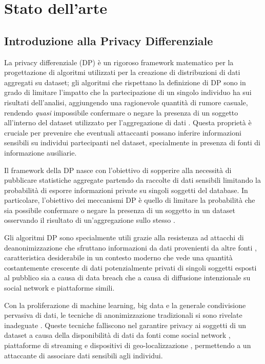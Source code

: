 \chapter{Stato dell'arte}

\section{Introduzione alla Privacy Differenziale}
La privacy differenziale (DP) è un rigoroso framework matematico per la progettazione di algoritmi utilizzati per la creazione di distribuzioni di dati aggregati su dataset; gli algoritmi che rispettano la definizione di DP sono in grado di limitare l'impatto che la partecipazione di un singolo individuo ha sui risultati dell'analisi, aggiungendo una ragionevole quantità di rumore casuale, rendendo \textit{quasi} impossibile confermare o negare la presenza di un soggetto all'interno del dataset utilizzato per l'aggregazione di dati \cite{Hilton2012Survey}. Questa proprietà è cruciale per prevenire che eventuali attaccanti possano inferire informazioni sensibili su individui partecipanti nel dataset, specialmente in presenza di fonti di informazione ausiliarie.

Il framework della DP nasce con l'obiettivo di sopperire alla necessità di pubblicare statistiche aggregate partendo da raccolte di dati sensibili limitando la probabilità di esporre informazioni private su singoli soggetti del database. In particolare, l'obiettivo dei meccanismi DP è quello di limitare la probabilità che sia possibile confermare o negare la presenza di un soggetto in un dataset osservando il risultato di un'aggregazione sullo stesso \cite{dwork2008survey}.

Gli algoritmi DP sono specialmente utili grazie alla resistenza ad attacchi di deanonimizzazione che sfruttano informazioni da dati provenienti da altre fonti \cite{TCS-042}, caratteristica desiderabile in un contesto moderno che vede una quantità costantemente crescente di dati potenzialmente privati di singoli soggetti esposti al pubblico sia a causa di data breach \cite{experianBreachForecast} che a causa di diffusione intenzionale su social network e piattaforme simili.

Con la proliferazione di machine learning, big data e la generale condivisione pervasiva di dati, le tecniche di anonimizzazione tradizionali si sono rivelate inadeguate \cite{dwork2008survey}. Queste tecniche falliscono nel garantire privacy ai soggetti di un dataset a causa della disponibilità di dati da fonti come social network \cite{deanon-socialnet}, piattaforme di streaming \cite{deanon-netflix} e dispositivi di geo-localizzazione \cite{deanon-geodata}, permettendo a un attaccante di associare dati sensibili agli individui.

